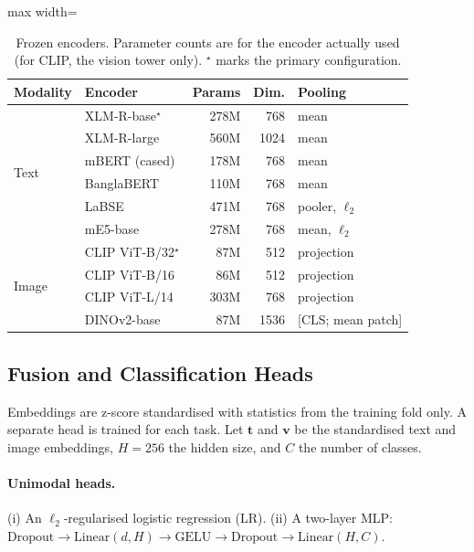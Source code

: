 \begin{table}[t]
\centering
\small
\caption{Frozen encoders. Parameter counts are for the encoder actually used (for CLIP, the vision tower only).
$^\star$ marks the primary configuration.}
\label{tab:encoders}
\begin{adjustbox}{max width=\columnwidth}
\begin{tabular}{llrrl}
\toprule
Modality & Encoder & Params & Dim. & Pooling \\
\midrule
\multirow{6}{*}{Text}
 & XLM-R-base$^\star$ & 278M & 768  & mean \\
 & XLM-R-large        & 560M & 1024 & mean \\
 & mBERT (cased)      & 178M & 768  & mean \\
 & BanglaBERT         & 110M & 768  & mean \\
 & LaBSE              & 471M & 768  & pooler, $\ell_2$ \\
 & mE5-base           & 278M & 768  & mean, $\ell_2$ \\
\midrule
\multirow{4}{*}{Image}
 & CLIP ViT-B/32$^\star$ & 87M  & 512  & projection \\
 & CLIP ViT-B/16         & 86M  & 512  & projection \\
 & CLIP ViT-L/14         & 303M & 768  & projection \\
 & DINOv2-base           & 87M  & 1536 & [CLS; mean patch] \\
\bottomrule
\end{tabular}
\end{adjustbox}
\end{table}

\subsection{Fusion and Classification Heads}
\label{sec:method:heads}

Embeddings are z-score standardised with statistics from the training fold only. A separate head is trained for each
task. Let $\mathbf{t}$ and $\mathbf{v}$ be the standardised text and image embeddings, $H=256$ the hidden size, and
$C$ the number of classes.

\paragraph{Unimodal heads.}
(i) An $\ell_2$-regularised logistic regression (LR). (ii) A two-layer MLP:
$\mathrm{Dropout}\!\to\!\mathrm{Linear}(d,H)\!\to\!\mathrm{GELU}\!\to\!\mathrm{Dropout}\!\to\!\mathrm{Linear}(H,C)$.

